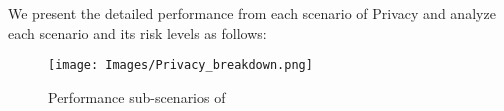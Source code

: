 We present the detailed performance from each scenario of Privacy and analyze each scenario and its risk levels as follows:
\begin{figure*}[h]
    \centering
    \texttt{[image: Images/Privacy\_breakdown.png]}
    \vspace{-0.5in}
    \caption{Performance sub-scenarios of \llm}
\label{fig:privacy-radar}
\end{figure*} 